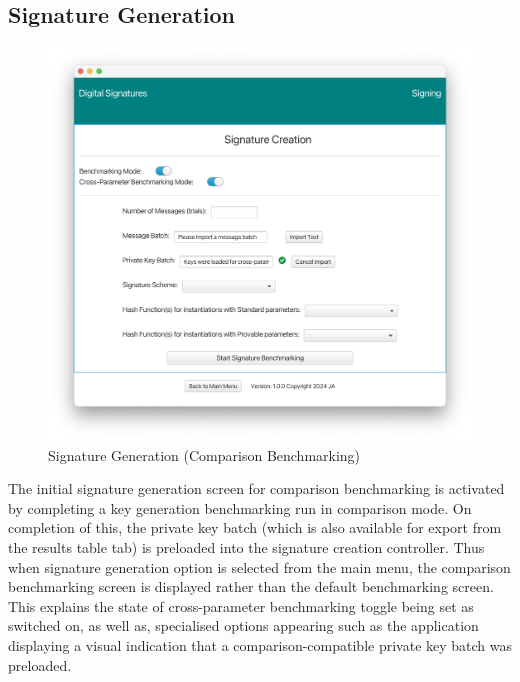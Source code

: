\documentclass[]{final_report}
\theoremstyle{definition}
\begin{document}
\subsection{Signature Generation}
\begin{figure}[H]
    \centering
    \includegraphics[scale= 0.4]{main_pictures/ui/signing/signing1.png}
    \caption{Signature Generation (Comparison Benchmarking)}
\end{figure}
The initial signature generation screen for comparison benchmarking is activated by completing a key generation benchmarking run in comparison mode. On completion of this, the private key batch (which is also available for export from the results table tab) is preloaded into the signature creation controller. Thus when signature generation option is selected from the main menu, the comparison benchmarking screen is displayed rather than the default benchmarking screen.
This explains the state of cross-parameter benchmarking toggle being set as switched on, as well as, specialised options appearing such as the application displaying a visual indication that a comparison-compatible private key batch was preloaded.
\end{document}

